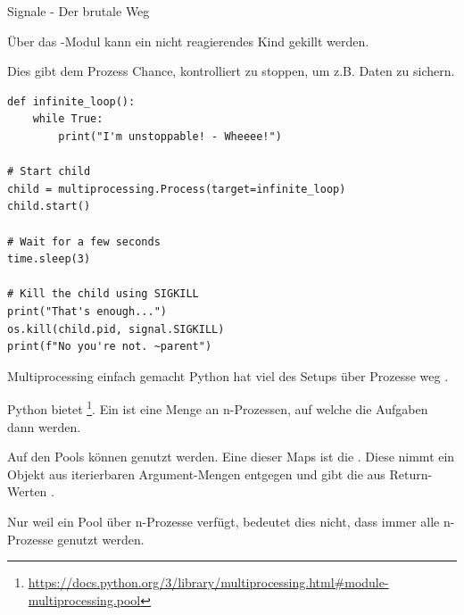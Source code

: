 \documentclass[12pt, aspectratio=169, usepdftitle=false, handout]{beamer}
\newcommand{\pp}[1]{\lpl{#1}}
\begin{document}
\begin{frame}[fragile]{Signale - Der brutale Weg}

		Über das \pp{os}-Modul kann ein nicht reagierendes Kind  gekillt werden.
		
		\pause
		
		Dies gibt dem Prozess  Chance, kontrolliert zu stoppen, um z.B. Daten zu sichern.

	\begin{lstlisting}[language=pytiny]
def infinite_loop():
    while True:
        print("I'm unstoppable! - Wheeee!")

# Start child
child = multiprocessing.Process(target=infinite_loop)
child.start()

# Wait for a few seconds
time.sleep(3)

# Kill the child using SIGKILL
print("That's enough...")
os.kill(child.pid, signal.SIGKILL)
print(f"No you're not. ~parent")
	\end{lstlisting}
\end{frame}


\begin{frame}[fragile]{Multiprocessing einfach gemacht}
        Python hat viel des Setups über Prozesse weg .

		\medskip
		
		\pause
		
		Python bietet \footnote{\url{https://docs.python.org/3/library/multiprocessing.html\#module-multiprocessing.pool}}.
		\newline
		Ein \pp{Pool} ist eine Menge an n-Prozessen, auf welche die Aufgaben dann  werden.
		
		\medskip
		
		\pause
		
		Auf den Pools können  genutzt werden. Eine dieser Maps ist die \pp{starmap}.
		\newline
		Diese nimmt ein  Objekt aus iterierbaren Argument-Mengen entgegen und gibt die  aus Return-Werten .
		
		\medskip
		
		\pause
		
		Nur weil ein Pool über n-Prozesse verfügt, bedeutet dies nicht, dass immer alle\newline
		n-Prozesse genutzt werden.

\end{frame}
\end{document}
